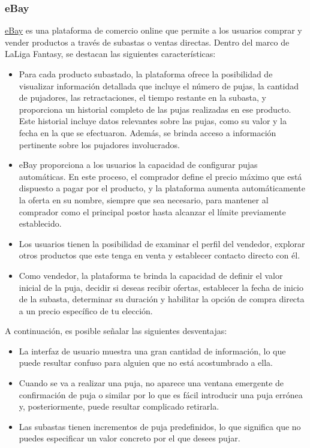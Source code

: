 \subsubsection{eBay}
\href{https://www.ebay.es/}{eBay} es una plataforma de comercio online que permite a los usuarios comprar y vender productos a través de subastas o ventas directas. 
Dentro del marco de LaLiga Fantasy, se destacan las siguientes características:
\begin{itemize}
    \item Para cada producto subastado, la plataforma ofrece la posibilidad de visualizar información detallada que incluye el número de pujas, la cantidad de pujadores, las retractaciones, el tiempo restante en la subasta, y proporciona un historial completo de las pujas realizadas en ese producto. Este historial incluye datos relevantes sobre las pujas, como su valor y la fecha en la que se efectuaron. Además, se brinda acceso a información pertinente sobre los pujadores involucrados.
    \item eBay proporciona a los usuarios la capacidad de configurar pujas automáticas. En este proceso, el comprador define el precio máximo que está dispuesto a pagar por el producto, y la plataforma aumenta automáticamente la oferta en su nombre, siempre que sea necesario, para mantener al comprador como el principal postor hasta alcanzar el límite previamente establecido.
    \item Los usuarios tienen la posibilidad de examinar el perfil del vendedor, explorar otros productos que este tenga en venta y establecer contacto directo con él.
    \item Como vendedor, la plataforma te brinda la capacidad de definir el valor inicial de la puja, decidir si deseas recibir ofertas, establecer la fecha de inicio de la subasta, determinar su duración y habilitar la opción de compra directa a un precio específico de tu elección.
\end{itemize}

A continuación, es posible señalar las siguientes desventajas:
\begin{itemize}
    \item La interfaz de usuario muestra una gran cantidad de información, lo que puede resultar confuso para alguien que no está acostumbrado a ella.
    \item Cuando se va a realizar una puja, no aparece una ventana emergente de confirmación de puja o similar por lo que es fácil introducir una puja errónea y, posteriormente, puede resultar complicado retirarla.
    \item Las subastas tienen incrementos de puja predefinidos, lo que significa que no puedes especificar un valor concreto por el que desees pujar.
\end{itemize}

